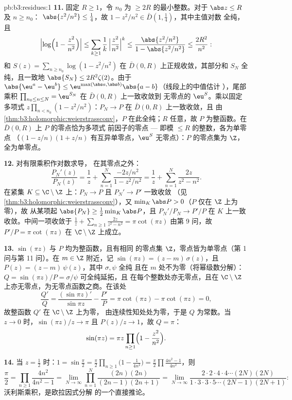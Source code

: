 \begin{solution}{pb:b3:residues:1}
\textbf{11.} 固定 $R \geq 1$，令 $n_0$ 为
$\geq 2R$ 的最小整数。对于 $\abs z \leq R$ 及 $n \geq n_0$：
$\abs{z^2/n^2} \leq \frac14$，故 $1 - z^2/n^2 \in
\bar D(1, \frac14)$，其中主值对数
全纯，且
\[
\Bigl|\log\Bigl(1 - \frac{z^2}{n^2}\Bigr)\Bigr|
\leq \sum_{k\geq1}\frac1k\,\Bigl|\frac{z^2}{n^2}\Bigr|^k
\leq \frac{\abs{z^2/n^2}}{1 - \abs{z^2/n^2}}
\leq \frac{2R^2}{n^2} :
\]
和 $S(z) = \sum_{n\geq n_0}\log(1 - z^2/n^2)$ 在
$\bar D(0, R)$ 上正规收敛，其部分和
$S_N$ 全纯，且一致地 $\abs{S_N} \leq 2R^2\zeta(2)$。由于
$\abs{\eu^a - \eu^b} \leq
\eu^{\max(\abs a,\abs b)}\abs{a - b}$（线段上的中值估计
），尾部乘积 $\prod_{n_0\leq n\leq N} =
\eu^{S_N}$ 在 $\bar D(0, R)$ 上一致收敛到
无零点的 $\eu^S$。乘以固定多项式
$z\prod_{n<n_0}(1 - z^2/n^2)$：$P_N \to P$ 在
$\bar D(0, R)$ 上一致收敛，且
由\cref{thm:b3:holomorphic:weierstrassconv}，$P$
在此全纯；$R$ 任意，故 $P$ 为整函数。在
$\bar D(0, R)$ 上 $P$ 的零点恰为多项式
前因子的零点 --- 即模 $\leq R$ 的整数，各为单零点
（$(1 - z/n)(1 + z/n)$ 有互异单零点，$\eu^S$
无零点）：$P$ 的零点集为 $\Z$，全为单零点。

\textbf{12.} 对有限乘积作对数求导，
在其零点之外：
\[
\frac{P_N'(z)}{P_N(z)} = \frac1z +
\sum_{n=1}^{N}\frac{-2z/n^2}{1 - z^2/n^2}
= \frac1z + \sum_{n=1}^{N}\frac{2z}{z^2 - n^2} .
\]
在紧集 $K \subseteq \C\setminus\Z$ 上：$P_N \to P$ 且
$P_N' \to P'$ 一致收敛
（见\cref{thm:b3:holomorphic:weierstrassconv}），又 $\min_K
\abs P > 0$（$P$ 仅在 $\Z$ 上为零），故
从某项起 $\abs{P_N} \geq \frac12\min_K\abs P$，且 $P_N'/P_N \to
P'/P$ 在 $K$ 上一致收敛。中间一项收敛于
$\frac1z + \sum_{n\geq1}\frac{2z}{z^2-n^2} = \pi\cot(\pi z)$
由第 9 问，故 $P'/P = \pi\cot(\pi z)$ 在
$\C\setminus\Z$ 上成立。

\textbf{13.} $\sin(\pi z)$ 与 $P$ 均为整函数，且有相同
的零点集 $\Z$，零点皆为单零点（第 1 问与第 11 问）。在
$m \in \Z$ 附近，记 $\sin(\pi z) = (z - m)\,\sigma(z)$，且
$P(z) = (z - m)\,\psi(z)$，其中 $\sigma, \psi$ 全纯
且在 $m$ 处不为零（将幂级数分解）：$Q =
\sin(\pi z)/P = \sigma/\psi$ 可全纯延拓，且
在每个整数处亦无零点，且在
$\C\setminus\Z$ 上亦无零点，为无零点函数之商。在该处
\[
\frac{Q'}{Q} = \frac{(\sin\pi z)'}{\sin\pi z} -
\frac{P'}{P} = \pi\cot(\pi z) - \pi\cot(\pi z) = 0 ,
\]
故整函数 $Q'$ 在 $\C\setminus\Z$ 上为零，
由连续性知处处为零，于是 $Q$ 为常数。当 $z \to
0$ 时，$\sin(\pi z)/z \to \pi$ 且 $P(z)/z \to 1$，故 $Q =
\pi$：
\[
\sin(\pi z) = \pi z\prod_{n\geq1}
\Bigl(1 - \frac{z^2}{n^2}\Bigr) .
\]

\textbf{14.} 当 $z = \frac12$ 时：$1 = \sin\frac\pi2 =
\frac\pi2\prod_{n\geq1}\bigl(1 - \frac1{4n^2}\bigr) =
\frac\pi2\prod\frac{4n^2-1}{4n^2}$，则
\[
\frac\pi2 = \prod_{n\geq1}\frac{4n^2}{4n^2 - 1}
= \lim_{N\to\infty}\prod_{n=1}^N
\frac{(2n)(2n)}{(2n-1)(2n+1)}
= \lim_{N\to\infty}
\frac{2\cdot2\cdot4\cdot4\cdots(2N)(2N)}
{1\cdot3\cdot3\cdot5\cdots(2N-1)(2N+1)} :
\]
沃利斯乘积，是欧拉因式分解
的一个直接推论。


\end{solution}
